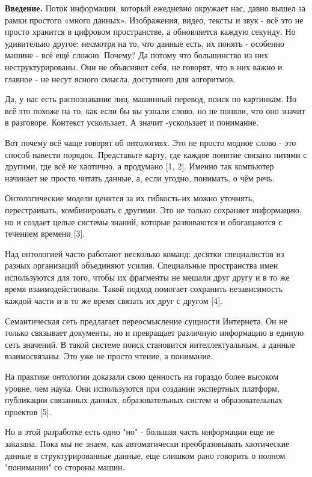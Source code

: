\begin{multicols}{2}
{\bfseries Введение.} Поток информации, который ежедневно окружает нас,
давно вышел за рамки простого «много данных». Изображения, видео, тексты
и звук - всё это не просто хранится в цифровом пространстве, а
обновляется каждую секунду. Но удивительно другое: несмотря на то, что
данные есть, их понять - особенно машине - всё ещё сложно. Почему? Да
потому что большинство из них неструктурированы. Они не объясняют себя,
не говорят, что в них важно и главное - не несут ясного смысла,
доступного для алгоритмов.

Да, у нас есть распознавание лиц, машинный перевод, поиск по картинкам.
Но всё это похоже на то, как если бы вы узнали слово, но не поняли, что
оно значит в разговоре. Контекст ускользает. А значит -ускользает и
понимание.

Вот почему всё чаще говорят об онтологиях. Это не просто модное слово -
это способ навести порядок. Представьте карту, где каждое понятие
связано нитями с другими, где всё не хаотично, а продумано {[}1, 2{]}.
Именно так компьютер начинает не просто читать данные, а, если угодно,
понимать, о чём речь.

Онтологические модели ценятся за их гибкость-их можно уточнять,
перестраивать, комбинировать с другими. Это не только сохраняет
информацию, но и создает целые системы знаний, которые развиваются и
обогащаются с течением времени {[}3{]}.

Над онтологией часто работают несколько команд: десятки специалистов из
разных организаций объединяют усилия. Специальные пространства имен
используются для того, чтобы их фрагменты не мешали друг другу и в то же
время взаимодействовали. Такой подход помогает сохранить независимость
каждой части и в то же время связать их друг с другом {[}4{]}.

Семантическая сеть предлагает переосмысление сущности Интернета. Он не
только связывает документы, но и превращает различную информацию в
единую сеть значений. В такой системе поиск становится интеллектуальным,
а данные взаимосвязаны. Это уже не просто чтение, а понимание.

На практике онтологии доказали свою ценность на гораздо более высоком
уровне, чем наука. Они используются при создании экспертных платформ,
публикации связанных данных, образовательных систем и образовательных
проектов {[}5{]}.

Но в этой разработке есть одно "но" - большая часть информации еще не
заказана. Пока мы не знаем, как автоматически преобразовывать
хаотические данные в структурированные данные, еще слишком рано говорить
о полном "понимании" со стороны машин.


\end{multicols}
